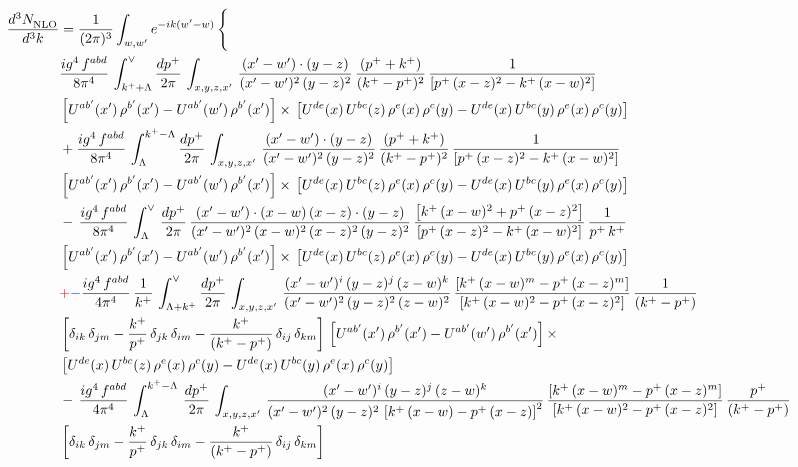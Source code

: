 \documentclass[9pt]{article}
\numberwithin{equation}{section}
\begin{document}
\begin{align}
    \frac{d^{3}N_{\rm NLO}^{\rm}}{d^{3}k}  & = \frac{1}{(2\pi)^{3}}  \int_{w, w^\prime} e^{-ik(w^\prime-w)}\, \Bigg\{\notag \\ &  \frac{ig^{4}\,f^{abd}}{8\pi^{4}}\,\int_{k^{+}+\Lambda}^{\vee}\frac{dp^{+}}{2\pi}\, \int_{x,y,z,x'}\, \frac{(x'-w')\cdot (y-z)}{(x'-w')^{2}\,(y-z)^{2}}\, \frac{(p^{+}+k^{+})}{(k^{+}-p^{+})^{2}}\, \frac{1}{\left[p^{+}\,(x-z)^{2}-k^{+}\,(x-w)^{2}\right]}\notag \\ & \left[U^{ab'}(x')\,\rho^{b'}(x')-U^{ab'}(w')\, \rho^{b'}(x')\right]\times\, \left[U^{de}(x)\,U^{bc}(z)\, \rho^{e}(x)\,\rho^{c}(y)-U^{de}(x)\,U^{bc}(y)\,\rho^{e}(x)\,\rho^{c}(y)\right]\notag \\ & + \frac{ig^{4}\,f^{abd}}{8\pi^{4}}\,\int_{\Lambda}^{k^{+}-\Lambda}\frac{dp^{+}}{2\pi}\, \int_{x,y,z,x'}\, \frac{(x'-w')\cdot (y-z)}{(x'-w')^{2}\,(y-z)^{2}}\, \frac{(p^{+}+k^{+})}{(k^{+}-p^{+})^{2}}\, \frac{1}{\left[p^{+}\,(x-z)^{2}-k^{+}\,(x-w)^{2}\right]}\notag \\ & \left[U^{ab'}(x')\,\rho^{b'}(x')-U^{ab'}(w')\, \rho^{b'}(x')\right]\times\, \left[U^{de}(x)\,U^{bc}(z)\, \rho^{e}(x)\,\rho^{c}(y)-U^{de}(x)\,U^{bc}(y)\,\rho^{e}(x)\,\rho^{c}(y)\right]\notag \\ & -\, \frac{ig^{4}\,f^{abd}}{8\pi^{4}}\, \int_{\Lambda}^{\vee}\, \frac{dp^{+}}{2\pi}\, \frac{(x'-w')\cdot (x-w)\, (x-z)\cdot (y-z)}{(x'-w')^{2}\, (x-w)^{2}\, (x-z)^{2}\, (y-z)^{2}}\, \frac{\left[k^{+}\,(x-w)^{2}+p^{+}\,(x-z)^{2}\right]}{\left[p^{+}\,(x-z)^{2}-k^{+}\,(x-w)^{2}\right]}\, \frac{1}{p^{+}\,k^{+}} \notag \\ & \left[U^{ab'}(x')\,\rho^{b'}(x')-U^{ab'}(w')\, \rho^{b'}(x')\right]\times\, \left[U^{de}(x)\,U^{bc}(z)\, \rho^{e}(x)\,\rho^{c}(y)-U^{de}(x)\,U^{bc}(y)\,\rho^{e}(x)\,\rho^{c}(y)\right]\notag \\ & {\color{red}+}{\color{blue}-}\frac{ig^{4}\, f^{abd}}{4\pi^{4}}\, \frac{1}{k^{+}}\,\int_{\Lambda + k^{+}}^{\vee}\frac{dp^{+}}{2\pi}\, \int_{x,y,z,x'}\,\frac{(x'-w')^{i}\, (y-z)^{j}\, (z-w)^{k}}{(x'-w')^{2}\, (y-z)^{2}\, (z-w)^{2}}\, \frac{\left[k^{+}\,(x-w)^{m}-p^{+}\,(x-z)^{m}\right]}{\left[k^{+}\,(x-w)^{2}-p^{+}\,(x-z)^{2}\right]}\,\frac{1}{(k^{+}-p^{+})}\notag \\ & \left[\delta_{ik}\, \delta_{jm} - \frac{k^{+}}{p^{+}}\, \delta_{jk}\, \delta_{im}-\frac{k^{+}}{(k^{+}-p^{+})}\, \delta_{ij}\,\delta_{km}\right]\, \left[U^{ab'}(x')\,\rho^{b'}(x')-U^{ab'}(w')\, \rho^{b'}(x')\right]\times\notag \\ & \left[U^{de}(x)\,U^{bc}(z)\, \rho^{e}(x)\,\rho^{c}(y)-U^{de}(x)\,U^{bc}(y)\,\rho^{e}(x)\,\rho^{c}(y)\right]\notag \\ & -\,\frac{ig^{4}\, f^{abd}}{4\pi^{4}}\, \int_{\Lambda}^{k^{+}-\Lambda}\,\frac{dp^{+}}{2\pi}\, \int_{x,y,z,x'}\,\frac{(x'-w')^{i}\, (y-z)^{j}\, (z-w)^{k}}{(x'-w')^{2}\, (y-z)^{2}\,\left[k^{+}\,(x-w)-p^{+}\,(x-z)\right]^{2}}\, \frac{\left[k^{+}\,(x-w)^{m}-p^{+}\,(x-z)^{m}\right]}{\left[k^{+}\,(x-w)^{2}-p^{+}\,(x-z)^{2}\right]}\,\frac{p^{+}}{(k^{+}-p^{+})}\notag \\ & \left[\delta_{ik}\, \delta_{jm} - \frac{k^{+}}{p^{+}}\, \delta_{jk}\, \delta_{im}-\frac{k^{+}}{(k^{+}-p^{+})}\, \delta_{ij}\,\delta_{km}\right]\, 
\end{align}
\end{document}

